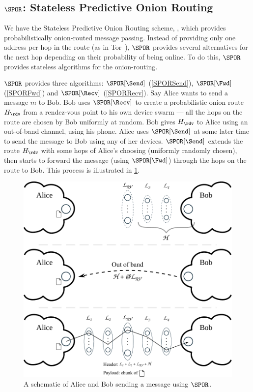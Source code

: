 
\subsection{\(\SPOR\): Stateless Predictive Onion Routing}


We have the Stateless Predictive Onion Routing scheme, \SPOR, which provides 
probabilistically onion-routed message passing.
Instead of providing only one address per hop in the route (as in \eg 
Tor~\cite{Tor}), \(\SPOR\) provides several alternatives for the next hop 
depending on their probability of being online.
To do this, \(\SPOR\) provides stateless algorithms for the onion-routing.

\(\SPOR\) provides three algorithms: \(\SPOR[\Send]\) (\cref{SPORSend}), 
\(\SPOR[\Fwd]\) (\cref{SPORFwd}) and \(\SPOR[\Recv]\) (\cref{SPORRecv}).
Say Alice wants to send a message \(m\) to Bob.
Bob uses \(\SPOR[\Recv]\) to create a probabilistic onion route \(H_\rdv\) from 
a rendez-vous point to his own device swarm --- all the hops on the route are 
chosen by Bob uniformly at random.
Bob gives \(H_\rdv\) to Alice using an out-of-band channel, \eg using his phone.
Alice uses \(\SPOR[\Send]\) at some later time to send the message to Bob using 
any of her devices.
\(\SPOR[\Send]\) extends the route \(H_\rdv\) with some hops of Alice's choosing 
(uniformly randomly chosen), then starts to forward the message (using 
\(\SPOR[\Fwd]\)) through the hops on the route to Bob.
This process is illustrated in \cref{fig:file-exchange}.

\begin{figure}
  \includegraphics[width=\linewidth]{figures/file_exchange.pdf}
  \caption{\label{fig:file-exchange}%
    A schematic of Alice and Bob sending a message using \(\SPOR\).
  }
\end{figure}

